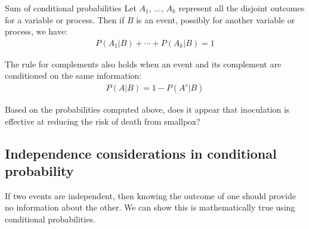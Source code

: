 \begin{onebox}{Sum of conditional probabilities}
Let $A_1$, ..., $A_k$ represent all the disjoint outcomes for a variable or process. Then if $B$ is an event, possibly for another variable or process, we have: \vspace{-1mm}
\begin{eqnarray*}
P(A_1|B)+\cdots+P(A_k|B) = 1
\end{eqnarray*}\vspace{-5.5mm} \par
The rule for complements also holds when an event and its complement are conditioned on the same information: \vspace{-1.5mm}
\begin{eqnarray*}
P(A | B) = 1 - P(A^c | B)
\end{eqnarray*}
\end{onebox}

\begin{exercisewrap}
\begin{nexercise}
Based on the probabilities computed above, does it appear that inoculation is effective at reducing the risk of death from smallpox?\footnotemark
\end{nexercise}
\end{exercisewrap}

\subsection{Independence considerations in conditional probability}

If two events are independent, then knowing the outcome of one should provide no information about the other. We can show this is mathematically true using conditional probabilities.

